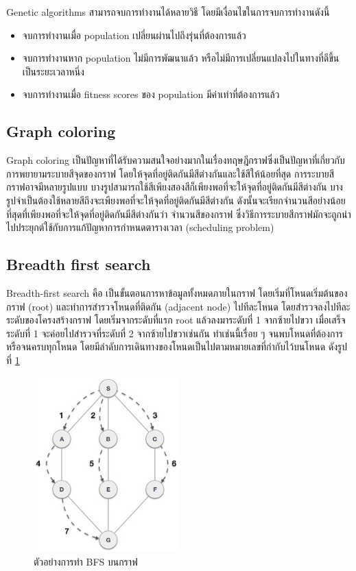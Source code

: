 Genetic algorithms สามารถจบการทำงานได้หลายวิธี โดยมีเงื่อนไขในการจบการทำงานดังนี้
\begin{itemize}
  \item จบการทำงานเมื่อ population เปลี่ยนผ่านไปถึงรุ่นที่ต้องการแล้ว 
  \item จบการทำงานหาก population ไม่มีการพัฒนาแล้ว หรือไม่มีการเปลี่ยนแปลงไปในทางที่ดีขึ้นเป็นระยะเวลาหนึ่ง
  \item จบการทำงานเมื่อ fitness scores ของ population มีค่าเท่าที่ต้องการแล้ว
\end{itemize}
\subsection{Graph coloring}
 
Graph coloring เป็นปัญหาที่ได้รับความสนใจอย่างมากในเรื่องทฤษฎีกราฟซึ่งเป็นปัญหาที่เกี่ยวกับการพยายามระบายสีจุดของกราฟ โดยให้จุดที่อยู่ติดกันมีสีต่างกันและใช้สีให้น้อยที่สุด
การระบายสีกราฟอาจมีหลายรูปแบบ บางรูปสามารถใช้สีเพียงสองสีก็เพียงพอที่จะให้จุดที่อยู่ติดกันมีสีต่างกัน บางรูปจำเป็นต้องใช้หลายสีถึงจะเพียงพอที่จะให้จุดที่อยู่ติดกันมีสีต่างกัน 
ดังนั้นจะเรียกจำนวนสีอย่างน้อยที่สุดที่เพียงพอที่จะให้จุดที่อยู่ติดกันมีสีต่างกันว่า จำนวนสีของกราฟ ซึ่งวิธีการระบายสีกราฟมักจะถูกนำไปประยุกต์ใช้กับการแก้ปัญหาการกำหนดตารางเวลา (scheduling problem) 
\subsection{Breadth first search}
Breadth-first search คือ เป็นขั้นตอนการหาข้อมูลทั้งหมดภายในกราฟ โดยเริ่มที่โหนดเริ่มต้นของกราฟ (root) และทำการสำรวจโหนดที่ติดกัน (adjacent node) ไปทีละโหนด โดยสำรวจลงไปทีละระดับของโครงสร้างกราฟ โดยเริ่มจากระดับที่แรก root แล้วลงมาระดับที่ 1 จากซ้ายไปขวา เมื่อเสร็จระดับที่ 1 จะค่อยไปสำรวจที่ระดับที่ 2 จากซ้ายไปขวาเช่นกัน ทําเช่นนี้เรื่อย ๆ
จนพบโหนดที่ต้องการ หรือจนครบทุกโหนด โดยมีลําดับการเดินทางของโหนดเป็นไปตามหมายเลขที่กํากับไว้บนโหนด
ดังรูปที่ \ref{fig:graph_bfs}
\begin{figure}
  \begin{center}
    \includegraphics[width=0.5\textwidth]{images/breadth_first_traversal.jpg}
  \end{center}
  \caption[ตัวอย่างการทำ BFS บนกราฟ]{ตัวอย่างการทำ BFS บนกราฟ}
  \label{fig:graph_bfs}     
\end{figure}

